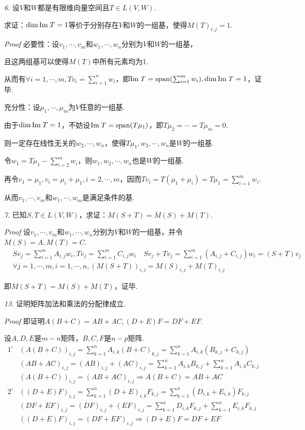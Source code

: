 \textit{6.}
设\(V\)和\(W\)都是有限维向量空间且\(T \in L(V,W)\).

求证：\(\dim \mathrm{Im \;} T=1\)等价于分别存在\(V\)和\(W\)的一组基，使得\(M(T)_{i,j}=1\).

\textit{Proof}
必要性：设\(v_1,\cdots,v_m\)和\(w_1,\cdots,w_n\)分别为\(V\)和\(W\)的一组基，

且这两组基可以使得\(M(T)\)中所有元素均为1.

从而有\(\forall i=1,\cdots,m,Tv_i=\sum_{i=1}^n w_i\)，即\(\mathrm{Im \;} T=\mathrm{span} (\sum_{i=1}^m w_i),\dim \mathrm{Im \;} T=1\)，证毕.

充分性：设\(\mu_1,\cdots,\mu_m\)为\(V\)任意的一组基.

由于\(\dim \mathrm{Im \;} T=1\)，不妨设\(\mathrm{Im \;} T=\mathrm{span} (T \mu_1)\)，即\(T \mu_2=\cdots=T \mu_m=0\).

则一定存在线性无关的\(w_2,\cdots,w_n\)，使得\(T \mu_1,w_2,\cdots,w_n\)是\(W\)的一组基.

令\(w_1=T \mu_1-\sum_{i=2}^m w_i\)，则\(w_1,w_2,\cdots,w_n\)也是\(W\)的一组基.

再令\(v_1=\mu_1,v_i=\mu_i+\mu_1,i=2,\cdots,m\)，因而\(Tv_i=T(\mu_1+\mu_i)=T \mu_1=\sum_{i=1}^m w_i\).

从而\(v_1,\cdots,v_m\)和\(w_1,\cdots,w_m\)是满足条件的基.

\hspace*{\fill}

\textit{7.}
已知\(S,T \in L(V,W)\)，求证：\(M(S+T)=M(S)+M(T)\).

\textit{Proof}
设\(v_1,\cdots,v_m\)和\(w_1,\cdots,w_n\)分别为\(V\)和\(W\)的一组基，并令\(M(S)=A,M(T)=C\).
    \begin{align*}
        &Sv_j=\sum_{i=1}^m A_{i,j}w_i,Tv_j=\sum_{i=1}^m C_{i,j}w_i \quad
        Sv_j+Tv_j=\sum_{i=1}^m (A_{i,j}+C_{i,j})w_i=(S+T)v_j \\
        &\forall j=1,\cdots,m,i=1,\cdots,n,(M(S+T))_{i,j}=M(S)_{i,j}+M(T)_{i,j}
    \end{align*}

即\(M(S+T)=M(S)+M(T)\)，证毕.

\newpage

\textit{13.}
证明矩阵加法和乘法的分配律成立.

\textit{Proof}
即证明\(A(B+C)=AB+AC,(D+E)F=DF+EF\).

设\(A,D,E\)是\(m-n\)矩阵，\(B,C,F\)是\(n-p\)矩阵.
    \begin{align*}
        1^{\circ} &(A(B+C))_{i,j}=\sum_{k=1}^n A_{i,k}(B+C)_{k,j}=\sum_{k=1}^n A_{i,k}(B_{k,j}+C_{k,j}) \\
        &(AB+AC)_{i,j}=(AB)_{i,j}+(AC)_{i,j}=\sum_{k=1}^n A_{i,k}B_{k,j}+\sum_{k=1}^n A_{i,k}C_{k,j} \\
        &(A(B+C))_{i,j}=(AB+AC)_{i,j} \Rightarrow A(B+C)=AB+AC \\
        2^{\circ} &((D+E)F)_{i,j}=\sum_{k=1}^n (D+E)_{i,k}F_{k,j}=\sum_{k=1}^n (D_{i,k}+E_{i,k})F_{k,j} \\
        &(DF+EF)_{i,j}=(DF)_{i,j}+(EF)_{i,j}=\sum_{k=1}^n D_{i,k}F_{k,j}+\sum_{k=1}^n E_{i,k}F_{k,j} \\
        &((D+E)F)_{i,j}=(DF+EF)_{i,j} \Rightarrow (D+E)F=DF+EF
    \end{align*}

